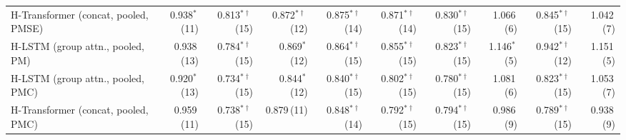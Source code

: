 \begin{tabular}{lrrrrrrrrr}
H-Transformer (concat, pooled, PMSE) & 0.938$^{*}${\scriptsize\,(11)} & 0.813$^{*\dagger}${\scriptsize\,(15)} & 0.872$^{*\dagger}${\scriptsize\,(12)} & 0.875$^{*\dagger}${\scriptsize\,(14)} & 0.871$^{*\dagger}${\scriptsize\,(14)} & 0.830$^{*\dagger}${\scriptsize\,(15)} & 1.066{\scriptsize\,(6)} & 0.845$^{*\dagger}${\scriptsize\,(15)} & 1.042{\scriptsize\,(7)} \\
H-LSTM (group attn., pooled, PM) & 0.938{\scriptsize\,(13)} & 0.784$^{*\dagger}${\scriptsize\,(15)} & 0.869$^{*}${\scriptsize\,(12)} & 0.864$^{*\dagger}${\scriptsize\,(15)} & 0.855$^{*\dagger}${\scriptsize\,(15)} & 0.823$^{*\dagger}${\scriptsize\,(15)} & 1.146$^{*}${\scriptsize\,(5)} & 0.942$^{*\dagger}${\scriptsize\,(12)} & 1.151{\scriptsize\,(5)} \\
H-LSTM (group attn., pooled, PMC) & 0.920$^{*}${\scriptsize\,(13)} & 0.734$^{*\dagger}${\scriptsize\,(15)} & 0.844$^{*}${\scriptsize\,(12)} & 0.840$^{*\dagger}${\scriptsize\,(15)} & 0.802$^{*\dagger}${\scriptsize\,(15)} & 0.780$^{*\dagger}${\scriptsize\,(15)} & 1.081{\scriptsize\,(6)} & 0.823$^{*\dagger}${\scriptsize\,(15)} & 1.053{\scriptsize\,(7)} \\
H-Transformer (concat, pooled, PMC) & 0.959{\scriptsize\,(11)} & 0.738$^{*\dagger}${\scriptsize\,(15)} & 0.879{\scriptsize\,(11)} & 0.848$^{*\dagger}${\scriptsize\,(14)} & 0.792$^{*\dagger}${\scriptsize\,(15)} & 0.794$^{*\dagger}${\scriptsize\,(15)} & 0.986{\scriptsize\,(9)} & 0.789$^{*\dagger}${\scriptsize\,(15)} & 0.938{\scriptsize\,(9)} \\
\bottomrule
\end{tabular}
